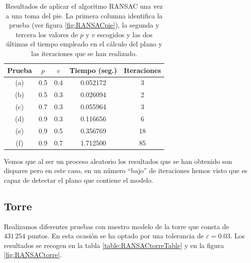 \begin{table}[h!]
	\centering
	\begin{tabular}{| c | c | c || c | c |} 
		\hline
		Prueba & $ p $ & $ v $ & Tiempo (seg.) & Iteraciones \\
		\hline
		(a) & 0.5 & 0.4 & 0.052172 & 3 \\		
		(b) & 0.5 & 0.3 & 0.026094 & 2  \\	
		(c) & 0.7 & 0.3 & 0.055964 &  3 \\
		(d) & 0.9 & 0.3 & 0.116656 & 6\\
		(e) & 0.9 & 0.5 & 0.356769 & 18\\
		(f) & 0.9 & 0.7 & 1.712500 & 85\\
		\hline
	\end{tabular}
	\caption{Resultados de aplicar el algoritmo RANSAC una vez a una toma del pie. La primera columna identifica la prueba (ver figura \ref{fig:RANSACpie}), la segunda y tercera los valores de $ p $ y $ v $ escogidos y las dos últimas el tiempo empleado en el cálculo del plano y las iteraciones que se han realizado.}
	\label{table:RANSACpieTable}
\end{table}

Vemos que al ser un proceso aleatorio los resultados que se han obtenido son dispares pero en este caso, en un número ``bajo'' de iteraciones hemos visto que es capaz de detectar el plano que contiene el modelo.

\subsection{Torre}
Realizamos diferentes pruebas con nuestro modelo de la torre que consta de $ 431\,254 $ puntos. En esta ocasión se ha optado por una tolerancia de $ \varepsilon = 0.03 $. Los resultados se recogen en la tabla \ref{table:RANSACtorreTable} y en la figura \ref{fig:RANSACtorre}. \\

